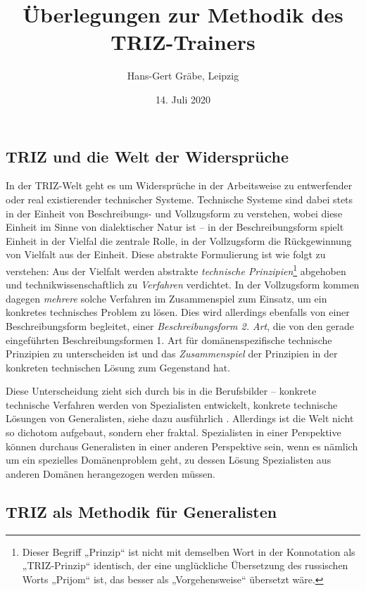 \documentclass[11pt,a4paper]{article}
\title{Überlegungen zur Methodik des TRIZ-Trainers}
\author{Hans-Gert Gr\"abe, Leipzig}
\date{14. Juli 2020}
\begin{document}
\maketitle

\subsection*{TRIZ und die Welt der Widersprüche}

In der TRIZ-Welt geht es um Widersprüche in der Arbeitsweise zu entwerfender
oder real existierender technischer Systeme. Technische Systeme sind dabei
stets in der Einheit von Beschreibungs- und Vollzugsform zu verstehen, wobei
diese Einheit im Sinne von \cite{Graebe2020} dialektischer Natur ist -- in der
Beschreibungsform spielt Einheit in der Vielfal die zentrale Rolle, in der
Vollzugsform die Rückgewinnung von Vielfalt aus der Einheit.  Diese abstrakte
Formulierung ist wie folgt zu verstehen: Aus der Vielfalt werden abstrakte
\emph{technische Prinzipien}\footnote{Dieser Begriff „Prinzip“ ist nicht mit
  demselben Wort in der Konnotation als „TRIZ-Prinzip“ identisch, der eine
  unglückliche Übersetzung des russischen Worts „Prijom“ ist, das besser als
  „Vorgehensweise“ übersetzt wäre.} abgehoben und technikwissenschaftlich zu
\emph{Verfahren} verdichtet. In der Vollzugsform kommen dagegen \emph{mehrere}
solche Verfahren im Zusammenspiel zum Einsatz, um ein konkretes technisches
Problem zu lösen. Dies wird allerdings ebenfalls von einer Beschreibungsform
begleitet, einer \emph{Beschreibungsform 2. Art}, die von den gerade
eingeführten Beschreibungsformen 1. Art für domänenspezifische technische
Prinzipien zu unterscheiden ist und das \emph{Zusammenspiel} der Prinzipien in
der konkreten technischen Lösung zum Gegenstand hat.

Diese Unterscheidung zieht sich durch bis in die Berufsbilder -- konkrete
technische Verfahren werden von Spezialisten entwickelt, konkrete technische
Lösungen von Generalisten, siehe dazu ausführlich \cite[Abschnitt
  9]{Graebe2020}.   Allerdings ist die Welt nicht so dichotom aufgebaut,
sondern eher fraktal.  Spezialisten in einer Perspektive können durchaus
Generalisten in einer anderen Perspektive sein, wenn es nämlich um ein
spezielles Domänenproblem geht, zu dessen Lösung Spezialisten aus anderen
Domänen herangezogen werden müssen.

\subsection*{TRIZ als Methodik für Generalisten}
\end{document}
